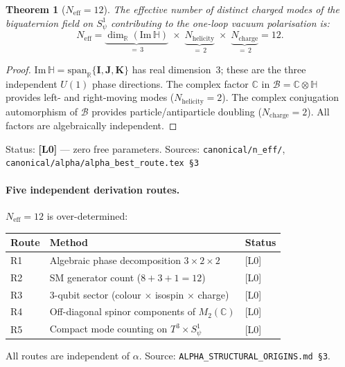 \documentclass[12pt,a4paper]{article}
\newtheorem{theorem}{Theorem}[section]
\theoremstyle{definition}
\theoremstyle{remark}
\begin{document}
\begin{theorem}[$N_{\mathrm{eff}} = 12$]
\label{thm:g5:Neff}
The effective number of distinct charged modes of the biquaternion field on
$S^1_\psi$ contributing to the one-loop vacuum polarisation is:
\begin{equation}
  N_{\mathrm{eff}}
  = \underbrace{\dim_\mathbb{R}(\mathrm{Im}\,\mathbb{H})}_{=\,3}
    \;\times\;
    \underbrace{N_\mathrm{helicity}}_{=\,2}
    \;\times\;
    \underbrace{N_\mathrm{charge}}_{=\,2}
  = 12.
  \label{eq:g5:Neff}
\end{equation}
\end{theorem}

\begin{proof}
$\mathrm{Im}\,\mathbb{H} = \mathrm{span}_\mathbb{R}\{\mathbf{I,J,K}\}$ has real
dimension~3; these are the three independent $U(1)$ phase directions.  The complex
factor $\mathbb{C}$ in $\mathcal{B} = \mathbb{C}\otimes\mathbb{H}$ provides left-
and right-moving modes ($N_\mathrm{helicity} = 2$).  The complex conjugation
automorphism of $\mathcal{B}$ provides particle/antiparticle doubling
($N_\mathrm{charge} = 2$).  All factors are algebraically independent.
\end{proof}

\begin{resultbox}
Status: \textbf{[L0]} — zero free parameters.
Sources: \texttt{canonical/n\_eff/}, \texttt{canonical/alpha/alpha\_best\_route.tex~\S3}
\end{resultbox}

\paragraph{Five independent derivation routes.}
$N_\mathrm{eff} = 12$ is over-determined:
\begin{center}
\begin{tabular}{lll}
\toprule
Route & Method & Status \\
\midrule
R1 & Algebraic phase decomposition $3\times 2\times 2$ & [L0] \\
R2 & SM generator count ($8+3+1=12$) & [L0] \\
R3 & 3-qubit sector (colour $\times$ isospin $\times$ charge) & [L0] \\
R4 & Off-diagonal spinor components of $M_2(\mathbb{C})$ & [L0] \\
R5 & Compact mode counting on $T^3\times S^1_\psi$ & [L0] \\
\bottomrule
\end{tabular}
\end{center}
All routes are independent of $\alpha$.  Source:
\texttt{ALPHA\_STRUCTURAL\_ORIGINS.md~\S3}.
\end{document}
